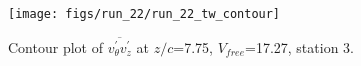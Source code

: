\begin{figure}[H]
\centering
\texttt{[image: figs/run\_22/run\_22\_tw\_contour]}
\caption{Contour plot of $\overline{v_{\theta}^{\prime} v_{z}^{\prime}}$ at $z/c$=7.75, $V_{free}$=17.27, station 3.}
\label{fig:run_22_tw_contour}
\end{figure}



